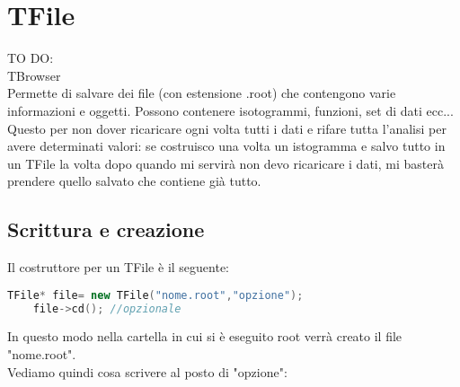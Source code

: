 \section{TFile}

TO DO:\\
TBrowser\\

Permette di salvare dei file (con estensione .root) che contengono varie informazioni e oggetti. Possono contenere isotogrammi, funzioni, set di dati ecc... Questo per non dover ricaricare ogni volta tutti i dati e rifare tutta l'analisi per avere determinati valori: se costruisco una volta un istogramma e salvo tutto in un TFile la volta dopo quando mi servirà non devo ricaricare i dati, mi basterà prendere quello salvato che contiene già tutto.

\subsection{Scrittura e creazione}
Il costruttore per un TFile è il seguente:
\begin{lstlisting}[language=C++,label={cod1},mathescape=true,breaklines=true]
	TFile* file= new TFile("nome.root","opzione");
	file->cd(); //opzionale
\end{lstlisting}
In questo modo nella cartella in cui si è eseguito root verrà creato il file "nome.root".\\ Vediamo quindi cosa scrivere al posto di "opzione":

